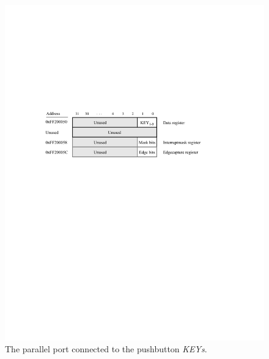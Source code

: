 \documentclass[epsfig,10pt,fullpage]{article}
\begin{document}
\begin{figure}[H]
	\begin{center}
	\includegraphics[scale=1]{figures/DE0_Nano_SoC/figureKEY.pdf}
	\end{center}
	\caption{The parallel port connected to the pushbutton {\it KEYs}.}
\label{fig:KEY2}
\end{figure}
\end{document}
